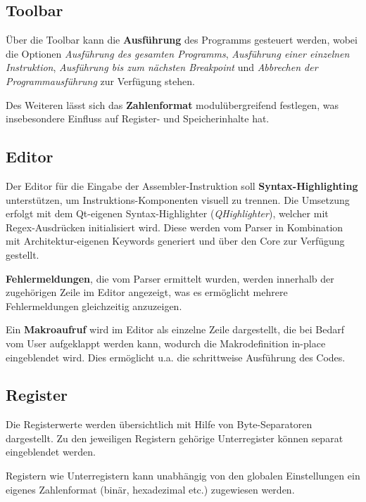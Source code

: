         \subsection{Toolbar}

            Über die Toolbar kann die \textbf{Ausführung} des Programms gesteuert werden, wobei die Optionen \textit{Ausführung des gesamten Programms}, \textit{Ausführung einer einzelnen Instruktion}, \textit{Ausführung bis zum nächsten Breakpoint} und \textit{Abbrechen der Programmausführung} zur Verfügung stehen.

            Des Weiteren lässt sich das \textbf{Zahlenformat} modulübergreifend festlegen, was insebesondere Einfluss auf Register- und Speicherinhalte hat.

        \subsection{Editor}

            Der Editor für die Eingabe der Assembler-Instruktion soll \textbf{Syntax-Highlighting} unterstützen, um Instruktions-Komponenten visuell zu trennen. Die Umsetzung erfolgt mit dem Qt-eigenen Syntax-Highlighter (\textit{QHighlighter}), welcher mit Regex-Ausdrücken initialisiert wird. Diese werden vom Parser in Kombination mit Architektur-eigenen Keywords generiert und über den Core zur Verfügung gestellt.

            \textbf{Fehlermeldungen}, die vom Parser ermittelt wurden, werden innerhalb der zugehörigen Zeile im Editor angezeigt, was es ermöglicht mehrere Fehlermeldungen gleichzeitig anzuzeigen.

            Ein \textbf{Makroaufruf} wird im Editor als einzelne Zeile dargestellt, die bei Bedarf vom User aufgeklappt werden kann, wodurch die Makrodefinition in-place eingeblendet wird. Dies ermöglicht u.a. die schrittweise Ausführung des Codes.

        \subsection{Register}

            Die Registerwerte werden übersichtlich mit Hilfe von Byte-Separatoren dargestellt. Zu den jeweiligen Registern gehörige Unterregister können separat eingeblendet werden.

            Registern wie Unterregistern kann unabhängig von den globalen Einstellungen ein eigenes Zahlenformat (binär, hexadezimal etc.) zugewiesen werden.

